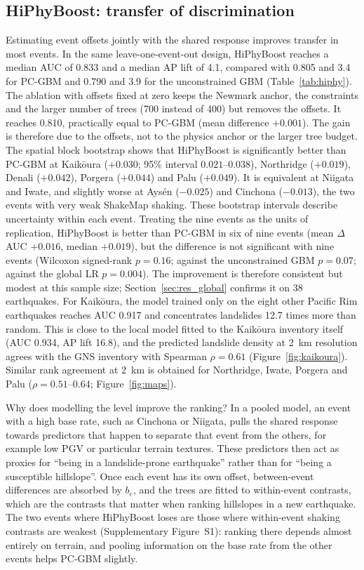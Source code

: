 \subsection{HiPhyBoost: transfer of discrimination}\label{sec:res_hiphy}
Estimating event offsets jointly with the shared response improves transfer in most events. In the same leave-one-event-out design, HiPhyBoost reaches a median AUC of 0.833 and a median AP lift of 4.1, compared with 0.805 and 3.4 for PC-GBM and 0.790 and 3.9 for the unconstrained GBM (Table~\ref{tab:hiphy}). The ablation with offsets fixed at zero keeps the Newmark anchor, the constraints and the larger number of trees (700 instead of 400) but removes the offsets. It reaches 0.810, practically equal to PC-GBM (mean difference $+0.001$). The gain is therefore due to the offsets, not to the physics anchor or the larger tree budget. The spatial block bootstrap shows that HiPhyBoost is significantly better than PC-GBM at Kaik\={o}ura ($+0.030$; 95\% interval $0.021$--$0.038$), Northridge ($+0.019$), Denali ($+0.042$), Porgera ($+0.044$) and Palu ($+0.049$). It is equivalent at Niigata and Iwate, and slightly worse at Ays\'en ($-0.025$) and Cinchona ($-0.013$), the two events with very weak ShakeMap shaking. These bootstrap intervals describe uncertainty within each event. Treating the nine events as the units of replication, HiPhyBoost is better than PC-GBM in six of nine events (mean $\Delta$AUC $+0.016$, median $+0.019$), but the difference is not significant with nine events (Wilcoxon signed-rank $p=0.16$; against the unconstrained GBM $p=0.07$; against the global LR $p=0.004$). The improvement is therefore consistent but modest at this sample size; Section~\ref{sec:res_global} confirms it on 38 earthquakes. For Kaik\={o}ura, the model trained only on the eight other Pacific Rim earthquakes reaches AUC 0.917 and concentrates landslides 12.7 times more than random. This is close to the local model fitted to the Kaik\={o}ura inventory itself (AUC 0.934, AP lift 16.8), and the predicted landslide density at 2~km resolution agrees with the GNS inventory with Spearman $\rho=0.61$ (Figure~\ref{fig:kaikoura}). Similar rank agreement at 2~km is obtained for Northridge, Iwate, Porgera and Palu ($\rho=0.51$--$0.64$; Figure~\ref{fig:maps}).

Why does modelling the level improve the ranking? In a pooled model, an event with a high base rate, such as Cinchona or Niigata, pulls the shared response towards predictors that happen to separate that event from the others, for example low PGV or particular terrain textures. These predictors then act as proxies for ``being in a landslide-prone earthquake'' rather than for ``being a susceptible hillslope''. Once each event has its own offset, between-event differences are absorbed by $b_e$, and the trees are fitted to within-event contrasts, which are the contrasts that matter when ranking hillslopes in a new earthquake. The two events where HiPhyBoost loses are those where within-event shaking contrasts are weakest (Supplementary Figure~S1): ranking there depends almost entirely on terrain, and pooling information on the base rate from the other events helps PC-GBM slightly.

